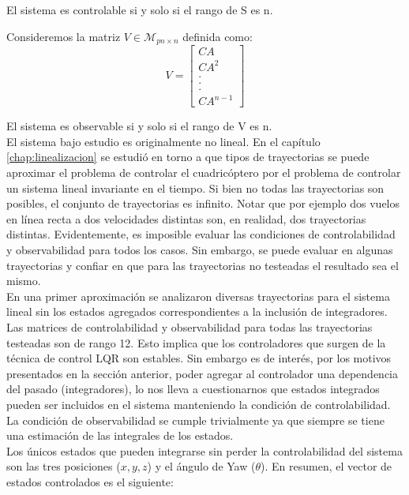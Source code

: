 \documentclass[main]{subfiles}
\begin{document}
El sistema es controlable si y solo si el rango de S es n. 

Consideremos la matriz $V\in \mathcal{M}_{pn \times n}$ definida como:
\begin{equation}
\label{eq:obs}
V=
\left[
\begin{array}{c}
 CA\\
CA^2\\
.\\
.\\
.\\
CA^{n-1}
\end{array}\right]
\end{equation}

El sistema es observable si y solo si el rango de V es n.\\

El sistema bajo estudio es originalmente no lineal. En el cap\'itulo \ref{chap:linealizacion} se estudi\'o en torno a que tipos de trayectorias se puede aproximar el problema de controlar el cuadric\'optero por el problema de controlar un sistema lineal invariante en el tiempo. Si bien no todas las trayectorias son posibles, el conjunto de trayectorias es infinito. Notar que por ejemplo dos vuelos en l\'inea recta a dos velocidades distintas son, en realidad, dos trayectorias distintas. Evidentemente, es imposible evaluar las condiciones de controlabilidad y observabilidad para todos los casos. Sin embargo, se puede evaluar en algunas trayectorias y confiar en que para las trayectorias no testeadas el resultado sea el mismo.\\

En una primer aproximaci\'on se analizaron diversas trayectorias para el sistema lineal sin los estados agregados correspondientes a la inclusi\'on de integradores. Las matrices de controlabilidad y observabilidad para todas las trayectorias testeadas son de rango 12. Esto implica que los controladores que surgen de la t\'ecnica de control LQR son estables. Sin embargo es de inter\'es, por los motivos presentados en la secci\'on anterior, poder agregar al controlador una dependencia del pasado (integradores), lo nos lleva a cuestionarnos que estados integrados pueden ser incluidos en el sistema manteniendo la condici\'on de controlabilidad. La condici\'on de observabilidad se cumple trivialmente ya que siempre se tiene una estimaci\'on de las integrales de los estados. \\

Los \'unicos estados que pueden integrarse sin perder la controlabilidad del sistema son las tres posiciones ($x,y,z$) y el \'angulo de Yaw ($\theta$). En resumen, el vector de estados controlados es el siguiente:
\end{document}
